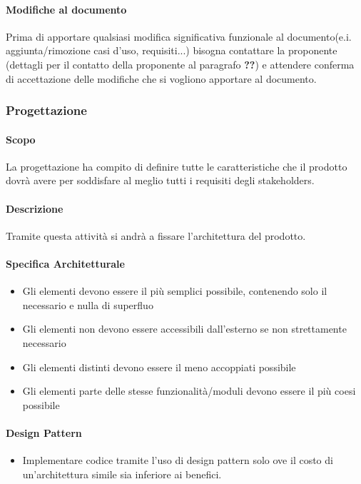 \documentclass[a4paper, 12pt]{article}
\begin{document}
\paragraph{Modifiche al documento}
Prima di apportare qualsiasi modifica significativa funzionale al documento(e.i. 
aggiunta/rimozione casi d'uso, requisiti...) bisogna contattare la proponente 
(dettagli per il contatto della proponente al paragrafo \textbf{??})
e attendere conferma di accettazione delle modifiche che si vogliono apportare
al documento.

\subsubsection{Progettazione}
\paragraph{Scopo}
La progettazione ha compito di definire tutte le caratteristiche che il prodotto dovrà avere per soddisfare al meglio
tutti i requisiti degli stakeholders.
\paragraph{Descrizione}
Tramite questa attività si andrà a fissare l'architettura del prodotto.
\paragraph{Specifica Architetturale}
\begin{itemize}
	\item Gli elementi devono essere il più semplici possibile, contenendo solo il necessario e nulla di superfluo
	\item Gli elementi non devono essere accessibili dall'esterno se non strettamente necessario
	\item Gli elementi distinti devono essere il meno accoppiati possibile
	\item Gli elementi parte delle stesse funzionalità/moduli devono essere il più coesi possibile
\end{itemize}
\paragraph{Design Pattern}
\begin{itemize}
	\item Implementare codice tramite l'uso di design pattern solo ove il costo di un'architettura simile sia inferiore
	ai benefici.
\end{itemize}
\end{document}
